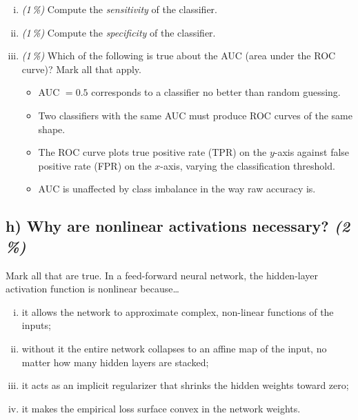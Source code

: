 \documentclass[11pt,a4paper]{article}
\newcommand{\subpoints}[1]{\textit{(#1\,\%)}}
\begin{document}
\begin{enumerate}[(i)]
  \item \subpoints{1} Compute the \emph{sensitivity} of the classifier.
  \item \subpoints{1} Compute the \emph{specificity} of the classifier.
  \item \subpoints{1} Which of the following is true about the AUC (area under the ROC curve)? Mark all that apply.
  \begin{itemize}
    \item[(A)] AUC $= 0.5$ corresponds to a classifier no better than random guessing.
    \item[(B)] Two classifiers with the same AUC must produce ROC curves of the same shape.
    \item[(C)] The ROC curve plots true positive rate (TPR) on the $y$-axis against false positive rate (FPR) on the $x$-axis, varying the classification threshold.
    \item[(D)] AUC is unaffected by class imbalance in the way raw accuracy is.
  \end{itemize}
\end{enumerate}

\subsection*{h) Why are nonlinear activations necessary? \subpoints{2}}
Mark all that are true. In a feed-forward neural network, the hidden-layer activation function is nonlinear because\dots
\begin{enumerate}[(i)]
  \item it allows the network to approximate complex, non-linear functions of the inputs;
  \item without it the entire network collapses to an affine map of the input, no matter how many hidden layers are stacked;
  \item it acts as an implicit regularizer that shrinks the hidden weights toward zero;
  \item it makes the empirical loss surface convex in the network weights.
\end{enumerate}
\end{document}
